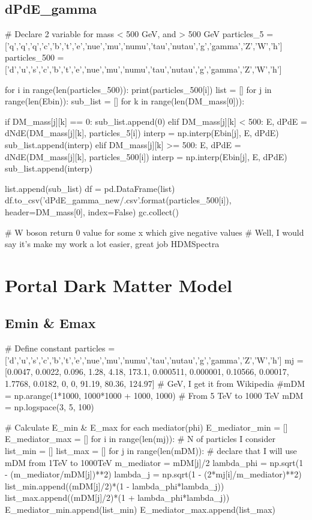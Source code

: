 \documentclass[10pt, oneside]{book}
\numberwithin{equation}{chapter}
\begin{document}
\subsection{dPdE\_gamma}
\begin{python}
# Declare 2 variable for mass < 500 GeV, and > 500 GeV
particles_5 = ['q','q','q','c','b','t','e','nue','mu','numu','tau','nutau','g','gamma','Z','W','h']
particles_500 = ['d','u','s','c','b','t','e','nue','mu','numu','tau','nutau','g','gamma','Z','W','h']

for i in range(len(particles_500)):
    print(particles_500[i])
    list = []
    for j in range(len(Ebin)):
        sub_list = []
        for k in range(len(DM_mass[0])):

            if DM_mass[j][k] == 0:
                sub_list.append(0)
            elif DM_mass[j][k] < 500:
                E, dPdE = dNdE(DM_mass[j][k], particles_5[i])
                interp = np.interp(Ebin[j], E, dPdE)
                sub_list.append(interp)
            elif DM_mass[j][k] >= 500:
                E, dPdE = dNdE(DM_mass[j][k], particles_500[i])
                interp = np.interp(Ebin[j], E, dPdE)
                sub_list.append(interp)

        list.append(sub_list)
    df = pd.DataFrame(list)
    df.to_csv('dPdE_gamma_new/{}.csv'.format(particles_500[i]), header=DM_mass[0], index=False)
    gc.collect()

# W boson return 0 value for some x which give negative values
# Well, I would say it's make my work a lot easier, great job HDMSpectra
\end{python}

\section{Portal Dark Matter Model}
\subsection{Emin \& Emax}
\begin{python}
# Define constant
particles = ['d','u','s','c','b','t','e','nue','mu','numu','tau','nutau','g','gamma','Z','W','h']
mj = [0.0047, 0.0022, 0.096, 1.28, 4.18, 173.1, 0.000511, 0.000001, 0.10566, 0.00017, 1.7768, 0.0182, 0, 0, 91.19, 80.36, 124.97] # GeV, I get it from Wikipedia
#mDM = np.arange(1*1000, 1000*1000 + 1000, 1000)   # From 5 TeV to 1000 TeV
mDM = np.logspace(3, 5, 100)

# Calculate E_min & E_max for each mediator(phi)
E_mediator_min = []
E_mediator_max = []
for i in range(len(mj)): # N of particles I consider
    list_min = []
    list_max = []
    for j in range(len(mDM)):  # declare that I will use mDM from 1TeV to 1000TeV
        m_mediator = mDM[j]/2
        lambda_phi = np.sqrt(1 - (m_mediator/mDM[j])**2)
        lambda_j = np.sqrt(1 - (2*mj[i]/m_mediator)**2)
        list_min.append((mDM[j]/2)*(1 - lambda_phi*lambda_j))
        list_max.append((mDM[j]/2)*(1 + lambda_phi*lambda_j))
    E_mediator_min.append(list_min)
    E_mediator_max.append(list_max)

\end{python}
\end{document}
